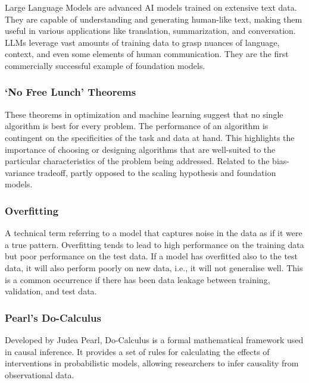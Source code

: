 Large Language Models are advanced AI models trained on extensive text data.
They are capable of understanding and generating human-like text, making them useful in various applications like translation, summarization, and conversation.
LLMs leverage vast amounts of training data to grasp nuances of language, context, and even some elements of human communication.
They are the first commercially successful example of foundation models.

\hypertarget{no-free-lunch-theorems}{%
\subsubsection{`No Free Lunch' Theorems}\label{no-free-lunch-theorems}}

These theorems in optimization and machine learning suggest that no single algorithm is best for every problem.
The performance of an algorithm is contingent on the specificities of the task and data at hand.
This highlights the importance of choosing or designing algorithms that are well-suited to the particular characteristics of the problem being addressed.
Related to the bias-variance tradeoff, partly opposed to the scaling hypothesis and foundation models.

\hypertarget{overfitting}{%
\subsubsection{Overfitting}\label{overfitting}}

A technical term referring to a model that captures noise in the data as if it were a true pattern.
Overfitting tends to lead to high performance on the training data but poor performance on the test data.
If a model has overfitted also to the test data, it will also perform poorly on new data, i.e., it will not generalise well.
This is a common occurrence if there has been data leakage between training, validation, and test data.

\hypertarget{pearls-do-calculus}{%
\subsubsection{Pearl's Do-Calculus}\label{pearls-do-calculus}}

Developed by Judea Pearl, Do-Calculus is a formal mathematical framework used in causal inference.
It provides a set of rules for calculating the effects of interventions in probabilistic models, allowing researchers to infer causality from observational data.

